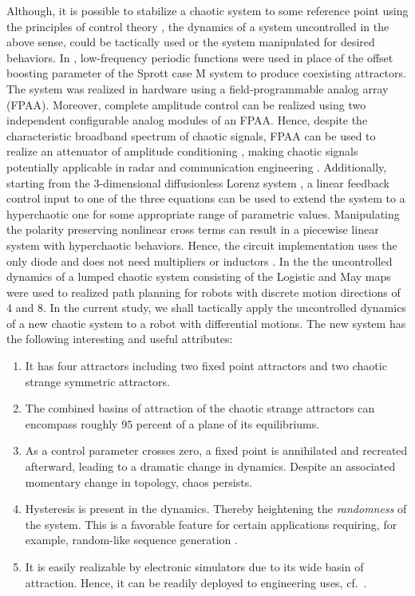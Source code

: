 \documentclass[final,5p,times,twocolumn]{elsarticle}
\begin{document}
Although, it is possible to stabilize a chaotic system to some reference point using the principles of control theory \cite{lai2020infinitely,azar2020stabilization,kamdoum2018dynamic}, the dynamics of a system uncontrolled in the above sense, could be tactically used or the system manipulated for desired behaviors. In \cite{li2018constructing}, low-frequency periodic functions were used in place of the offset boosting parameter of the Sprott case M system \cite{sprott1994some} to produce coexisting attractors. The system was realized in hardware using a field-programmable analog array (FPAA). Moreover, complete amplitude control can be realized using two independent configurable analog modules of an FPAA. Hence, despite the characteristic broadband spectrum of chaotic signals, FPAA can be used to realize an attenuator of amplitude conditioning \cite{li2017linear}, making chaotic signals potentially applicable in radar and communication engineering \cite{wang2015target,liu2007principles,sobhy2000chaotic}. Additionally, starting from the  $3$-dimensional diffusionless Lorenz system \cite{van2000diffusionless}, a linear feedback control input to one of the three equations can be used to extend the system to a hyperchaotic one for some appropriate range of parametric values. Manipulating the polarity preserving nonlinear cross terms can result in a piecewise linear system with hyperchaotic behaviors. Hence, the circuit implementation uses the only diode and does not need multipliers or inductors \cite{li2014new}. In the \cite{petavratzis2020chaotic} the uncontrolled dynamics of a lumped chaotic system consisting of the Logistic and May maps were used to realized path planning for robots with discrete motion directions of $4$ and $8$. In the current study, we shall tactically apply the uncontrolled dynamics of a new chaotic system to a robot with differential motions. The new system has the following interesting and useful attributes: %
\begin{enumerate}
	\item It has four attractors including two fixed point attractors and two chaotic strange symmetric attractors.
	\item The combined basins of attraction of the chaotic strange attractors can encompass roughly $95$ percent of a plane of its equilibriums.
	\item As a control parameter crosses zero, a fixed point is annihilated and recreated afterward, leading to a dramatic change in dynamics. Despite an associated momentary change in topology, chaos persists.
	\item\label{hystereis} Hysteresis is present in the dynamics. Thereby heightening the \textit{randomness} of the system. This is a favorable feature for certain applications requiring, for example, random-like sequence generation \cite{kengne2018dynamics}. 
	\item It is easily realizable by electronic simulators due to its wide basin of attraction. Hence, it can be readily deployed to engineering uses, cf.~\cite{nwachioma2019new}\label{n2}.
\end{enumerate}
\end{document}
